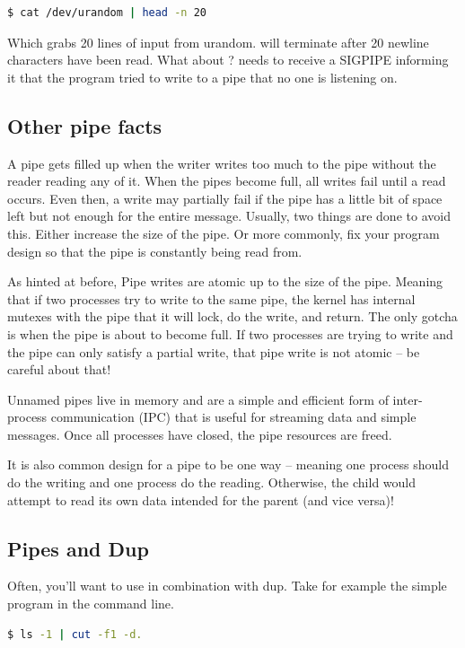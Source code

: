 \begin{lstlisting}[language=bash]
$ cat /dev/urandom | head -n 20
\end{lstlisting}
Which grabs 20 lines of input from urandom.  will terminate after 20 newline characters have been read.
What about ?
 needs to receive a SIGPIPE informing it that the program tried to write to a pipe that no one is listening on.

\subsection{Other pipe facts}

A pipe gets filled up when the writer writes too much to the pipe without the reader reading any of it. When the pipes become full, all writes fail until a read occurs. Even then, a write may partially fail if the pipe has a little bit of space left but not enough for the entire message. Usually, two things are done to avoid this. Either increase the size of the pipe. Or more commonly, fix your program design so that the pipe is constantly being read from.

As hinted at before, Pipe writes are atomic up to the size of the pipe. Meaning that if two processes try to write to the same pipe, the kernel has internal mutexes with the pipe that it will lock, do the write, and return. The only gotcha is when the pipe is about to become full. If two processes are trying to write and the pipe can only satisfy a partial write, that pipe write is not atomic -- be careful about that!

Unnamed pipes live in memory and are a simple and efficient form of inter-process communication (IPC) that is useful for streaming data and simple messages. Once all processes have closed, the pipe resources are freed.

It is also common design for a pipe to be one way -- meaning one process should do the writing and one process do the reading. Otherwise, the child would attempt to read its own data intended for the parent (and vice versa)!

\subsection{Pipes and Dup}

Often, you'll want to use  in combination with dup.
Take for example the simple program in the command line.

\begin{lstlisting}[language=bash]
$ ls -1 | cut -f1 -d.
\end{lstlisting}

